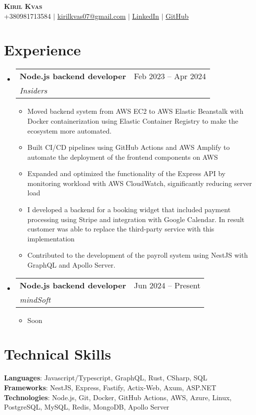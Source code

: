 \documentclass[letterpaper,11pt]{article}
\makeatletter
\newcommand{\resumeItem}[1]{
  \item\small{
    {#1 \vspace{-2pt}}
  }
}
\newcommand{\resumeSubheading}[4]{
  \vspace{-2pt}\item
    \begin{tabular*}{0.97\textwidth}[t]{l@{\extracolsep{\fill}}r}
      \textbf{#1} & #2 \\
      \textit{\small#3} & \textit{\small #4} \\
    \end{tabular*}\vspace{-7pt}
}
\newcommand{\resumeSubHeadingListStart}{\begin{itemize}[leftmargin=0.15in, label={}]}
\newcommand{\resumeSubHeadingListEnd}{\end{itemize}}
\newcommand{\resumeItemListStart}{\begin{itemize}}
\newcommand{\resumeItemListEnd}{\end{itemize}\vspace{-5pt}}
\makeatother
\begin{document}
\begin{center}
    \textbf{\Huge \scshape Kiril Kvas} \\ \vspace{1pt}
    \small +380981713584 $|$ \href{mailto:kirilkvas07@gmail.com}{\underline{kirilkvas07@gmail.com}} $|$ 
    \href{https://www.linkedin.com/in/kiril-kvas-999154239/}{\underline{LinkedIn}} $|$
    \href{https://github.com/rillsvai}{\underline{GitHub}}
\end{center}




\section{Experience}
  \resumeSubHeadingListStart
    \resumeSubheading
      {Node.js backend developer}{Feb 2023 -- Apr 2024}
      {Insiders}{}
      \resumeItemListStart
            \resumeItem{Moved backend system from AWS EC2 to AWS Elastic Beanstalk with Docker containerization using Elastic Container Registry to make the ecosystem more automated.}
            \resumeItem{Built CI/CD pipelines using GitHub Actions and AWS Amplify to automate the deployment of the frontend components on AWS }
            \resumeItem{Expanded and optimized the functionality of the Express API by monitoring workload with AWS CloudWatch, significantly reducing server load}
            \resumeItem{I developed a backend for a booking widget that included payment processing using Stripe and integration with Google Calendar. In result customer was able to replace the third-party service with this implementation}
            \resumeItem{ Contributed to the development of the payroll system using NestJS with GraphQL and Apollo Server. }
      \resumeItemListEnd
  \resumeSubHeadingListEnd
  \resumeSubHeadingListStart
    \resumeSubheading
      {Node.js backend developer}{Jun 2024 -- Present}
      {mindSoft}{}
      \resumeItemListStart
        \resumeItem{Soon}
      \resumeItemListEnd
  \resumeSubHeadingListEnd
\section{Technical Skills}
 \begin{itemize}[leftmargin=0.15in, label={}]
    \small{\item{
     \textbf{Languages}{: Javascript/Typescript, GraphQL, Rust, CSharp, SQL} \\
     \textbf{Frameworks}{: NestJS, Express, Fastify, Actix-Web, Axum, ASP.NET} \\
     \textbf{Technologies}{: Node.js, Git, Docker, GitHub Actions, AWS, Azure, Linux, PostgreSQL, MySQL, Redis, MongoDB, Apollo Server} \\
    }}
 \end{itemize}
 
\end{document}
